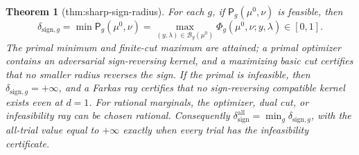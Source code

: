 \documentclass{article}
\newtheorem{theorem}{Theorem}
\begin{document}
\begin{theorem}[thm:sharp-sign-radius]\label{thm:sharp-sign-radius}
For each \(g\), if \(\mathsf P_g(\mu^0,\nu)\) is feasible, then \[\delta_{\mathrm{sign},g}=\min\mathsf P_g(\mu^0,\nu)=\max_{(y,\lambda)\in\mathcal B_g(\mu^0)}\Phi_g(\mu^0,\nu;y,\lambda)\in[0,1].\] The primal minimum and finite-cut maximum are attained; a primal optimizer contains an adversarial sign-reversing kernel, and a maximizing basic cut certifies that no smaller radius reverses the sign. If the primal is infeasible, then \(\delta_{\mathrm{sign},g}=+\infty\), and a Farkas ray certifies that no sign-reversing compatible kernel exists even at \(d=1\). For rational marginals, the optimizer, dual cut, or infeasibility ray can be chosen rational. Consequently \(\delta_{\mathrm{sign}}^{\mathrm{all}}=\min_g\delta_{\mathrm{sign},g}\), with the all-trial value equal to \(+\infty\) exactly when every trial has the infeasibility certificate.
\end{theorem}
\end{document}
